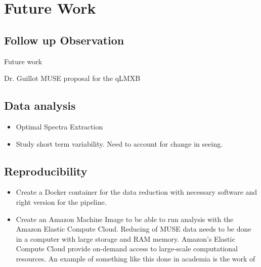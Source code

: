 \chapter{Future Work}\label{chap:future}
\thispagestyle{fancy}

\section{Follow up Observation}

Future work 


    Dr. Guillot MUSE proposal for the qLMXB
    
\section{Data analysis}
    
    \begin{itemize}
\item Optimal Spectra Extraction \citep{horne_emission_1986}
\item Study short term variability. Need to account for change in seeing.
\end{itemize}

\section{Reproducibility}
\begin{itemize}
\item  Create a Docker container for the data reduction with necessary software and right version for the pipeline. 
\item Create an Amazon Machine Image to be able to run analysis with the Amazon Elastic Compute Cloud. Reducing of MUSE data needs to be done in a computer with large storage and RAM memory. Amazon's Elastic Compute Cloud provide on-demand access to large-scale computational resources. An example of something like this done in academia is the work of \cite{ragan-kelley_collaborative_2013}
\end{itemize}
